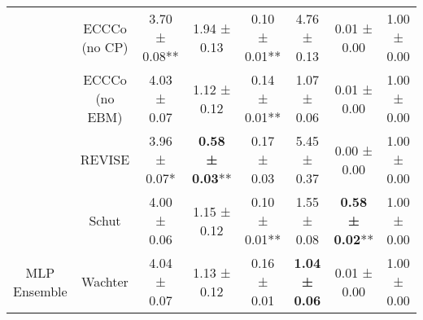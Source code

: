\begin{table}
{\begin{tabular}[t]{cccccccc}
 & ECCCo (no CP) & 3.70 ± 0.08** & 1.94 ± 0.13\hphantom{*}\hphantom{*} & 0.10 ± 0.01** & 4.76 ± 0.13\hphantom{*}\hphantom{*} & 0.01 ± 0.00\hphantom{*}\hphantom{*} & 1.00 ± 0.00\hphantom{*}\hphantom{*}\\

 & ECCCo (no EBM) & 4.03 ± 0.07\hphantom{*}\hphantom{*} & 1.12 ± 0.12\hphantom{*}\hphantom{*} & 0.14 ± 0.01** & 1.07 ± 0.06\hphantom{*}\hphantom{*} & 0.01 ± 0.00\hphantom{*}\hphantom{*} & 1.00 ± 0.00\hphantom{*}\hphantom{*}\\

 & REVISE & 3.96 ± 0.07*\hphantom{*} & \textbf{0.58 ± 0.03}** & 0.17 ± 0.03\hphantom{*}\hphantom{*} & 5.45 ± 0.37\hphantom{*}\hphantom{*} & 0.00 ± 0.00\hphantom{*}\hphantom{*} & 1.00 ± 0.00\hphantom{*}\hphantom{*}\\

 & Schut & 4.00 ± 0.06\hphantom{*}\hphantom{*} & 1.15 ± 0.12\hphantom{*}\hphantom{*} & 0.10 ± 0.01** & 1.55 ± 0.08\hphantom{*}\hphantom{*} & \textbf{0.58 ± 0.02}** & 1.00 ± 0.00\hphantom{*}\hphantom{*}\\

\multirow[t]{-10}{*}{\centering\arraybackslash MLP Ensemble} & Wachter & 4.04 ± 0.07\hphantom{*}\hphantom{*} & 1.13 ± 0.12\hphantom{*}\hphantom{*} & 0.16 ± 0.01\hphantom{*}\hphantom{*} & \textbf{1.04 ± 0.06}\hphantom{*}\hphantom{*} & 0.01 ± 0.00\hphantom{*}\hphantom{*} & 1.00 ± 0.00\hphantom{*}\hphantom{*}\\
\bottomrule
\end{tabular}}
\end{table}
